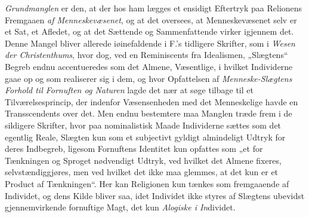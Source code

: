 \emph{Grundmanglen} er den, at der hos ham lægges et ensidigt Eftertryk paa
Relionens Fremgaaen \emph{af Menneskevæsenet}, og at det oversees, at
Menneskevæsenet selv er et Sat, et Afledet, og at det Sættende og Sammenfattende
virker igjennem det. Denne Mangel bliver allerede iøinefaldende i F.'s tidligere
Skrifter, som i \emph{Wesen der Christenthums}, hvor dog, ved en Reminiscents fra
Idealismen, „Slægtens“ Begreb endnu accentueredes som det Almene, Væsentlige, i
hvilket Individerne gaae op og som realiserer sig i dem, og hvor Opfattelsen af
\emph{Menneske-Slægtens Forhold til Fornuften og Naturen} lagde det nær at søge
tilbage til et Tilværelsesprincip, der indenfor Væsensenheden med det
Menneskelige havde en Transscendents over det. Men endnu bestemtere maa Manglen
træde frem i de sildigere Skrifter, hvor paa nominalistisk Maade Individerne
 sættes som det egentlig Reale, Slægten kun som et subjectivt gyldigt almindeligt
Udtryk for deres Indbegreb, ligesom Fornuftens Identitet kun opfattes som „et for
Tænkningen og Sproget nødvendigt Udtryk, ved hvilket det Almene fixeres,
selvstændiggjøres, men ved hvilket det ikke maa glemmes, at det kun er et Product
af Tænkningen“. Her kan Religionen kun tænkes som fremgaaende af Individet, og
dens Kilde bliver saa, idet Individet ikke styres af Slægtens ubevidst
gjennemvirkende fornuftige Magt, det kun \emph{Alogiske i In}dividet.


